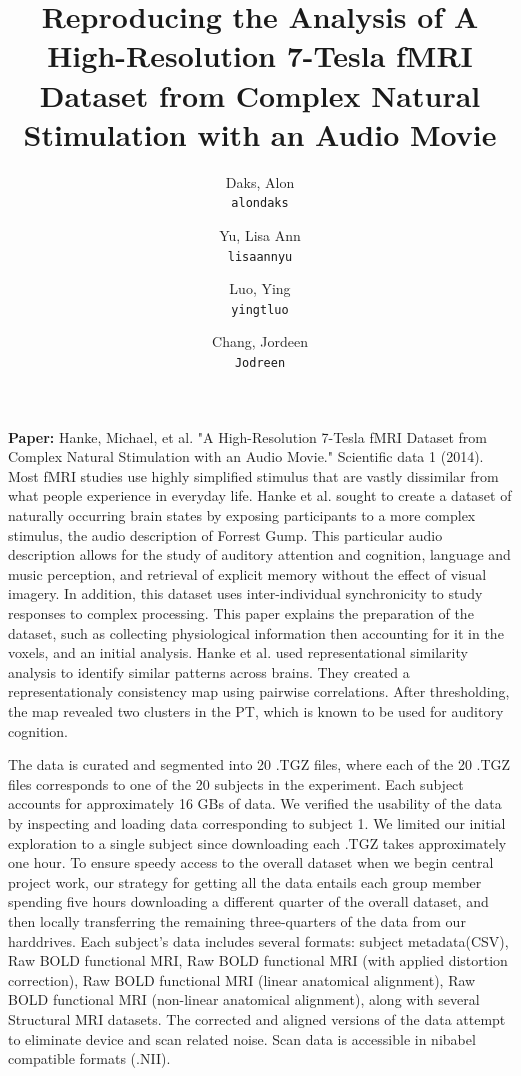 \documentclass[11pt]{article}
\title{Reproducing the Analysis of A High-Resolution 7-Tesla fMRI Dataset from 
Complex Natural Stimulation with an Audio Movie}
\author{
  Daks, Alon\\
  \texttt{alondaks}
  \and
  Yu, Lisa Ann\\
  \texttt{lisaannyu}
  \and
  Luo, Ying\\
  \texttt{yingtluo}
  \and
  Chang, Jordeen\\
  \texttt{Jodreen}
}
\begin{document}
\maketitle


\textbf{Paper:} Hanke, Michael, et al. "A High-Resolution 7-Tesla fMRI Dataset 
from Complex Natural Stimulation with an Audio Movie." Scientific data 1 (2014).
\newline
\newline    
\indent Most fMRI studies use highly simplified stimulus that are vastly 
dissimilar from what people experience in everyday life.  Hanke et al. sought to
create a
dataset of naturally occurring brain states by exposing participants to a 
more complex stimulus, the audio description of Forrest Gump.  This particular
audio description allows for the study of auditory attention and cognition, 
language and music perception, and retrieval of explicit memory without the
effect of visual imagery.  In addition, this dataset uses inter-individual 
synchronicity to study responses to complex processing.  This paper explains
the preparation of the dataset, such as collecting physiological information
then accounting for it in the voxels, and an initial analysis.  Hanke et al.
used representational similarity analysis to identify similar patterns
across brains.  They created a representationaly consistency map using pairwise
correlations.  After thresholding, the map revealed two clusters in the PT,
which is known to be used for auditory cognition.

The data is curated and segmented into 20 .TGZ files, where each of the 20 .TGZ 
files corresponds to one of the 20 subjects in the experiment. Each subject 
accounts for approximately 16 GBs of data. We verified the usability of the data
by inspecting and loading data corresponding to subject 1. We limited our 
initial exploration to a single subject since downloading each .TGZ takes 
approximately one hour. To ensure speedy access to the overall dataset when we 
begin central project work, our strategy for getting all the data entails each 
group member spending five hours downloading a different quarter of the overall
dataset, and then locally transferring the remaining three-quarters of the data
from our harddrives. Each subject's data includes several formats: subject
metadata(CSV), Raw BOLD functional MRI, Raw BOLD functional MRI 
(with applied distortion correction), Raw BOLD functional MRI (linear anatomical
alignment), Raw BOLD functional MRI (non-linear anatomical alignment), along 
with several Structural MRI datasets. The corrected and aligned versions of the
data attempt to eliminate device and scan related noise. Scan data is 
accessible in nibabel compatible formats (.NII).
\end{document}
